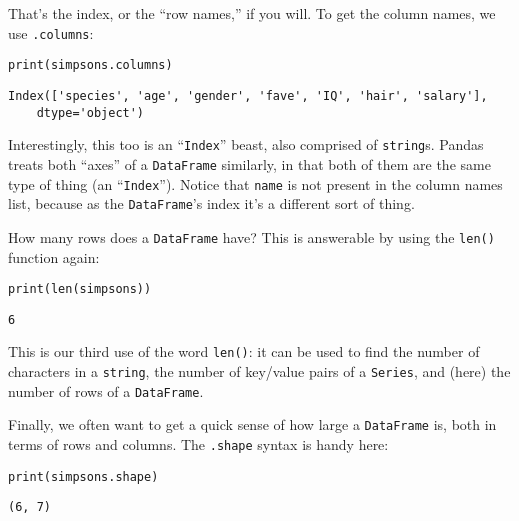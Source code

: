 That's the index, or the ``row names,'' if you will. To get the column names,
we use \texttt{.columns}:

\begin{Verbatim}[fontsize=\small,samepage=true,frame=single,framesep=3mm]
print(simpsons.columns)
\end{Verbatim}
\vspace{-.2in}

\begin{Verbatim}[fontsize=\small,samepage=true,frame=leftline,framesep=5mm,framerule=1mm]
Index(['species', 'age', 'gender', 'fave', 'IQ', 'hair', 'salary'],
    dtype='object')
\end{Verbatim}

Interestingly, this too is an ``\texttt{Index}'' beast, also comprised of
\texttt{string}s. Pandas treats both ``axes'' of a \texttt{DataFrame}
similarly, in that both of them are the same type of thing (an
``\texttt{Index}''). Notice that \texttt{name} is not present in the column
names list, because as the \texttt{DataFrame}'s index it's a different sort of
thing.


How many rows does a \texttt{DataFrame} have? This is answerable by using the
\texttt{len()} function again:

\begin{Verbatim}[fontsize=\small,samepage=true,frame=single,framesep=3mm]
print(len(simpsons))
\end{Verbatim}
\vspace{-.2in}

\begin{Verbatim}[fontsize=\small,samepage=true,frame=leftline,framesep=5mm,framerule=1mm]
6
\end{Verbatim}

This is our third use of the word \texttt{len()}: it can be used to find the
number of characters in a \texttt{string}, the number of key/value pairs of a
\texttt{Series}, and (here) the number of rows of a \texttt{DataFrame}.

Finally, we often want to get a quick sense of how large a \texttt{DataFrame}
is, both in terms of rows and columns. The \texttt{.shape} syntax is handy
here:

\begin{samepage}
\begin{Verbatim}[fontsize=\small,samepage=true,frame=single,framesep=3mm]
print(simpsons.shape)
\end{Verbatim}
\vspace{-.2in}

\begin{Verbatim}[fontsize=\small,samepage=true,frame=leftline,framesep=5mm,framerule=1mm]
(6, 7)
\end{Verbatim}
\end{samepage}

